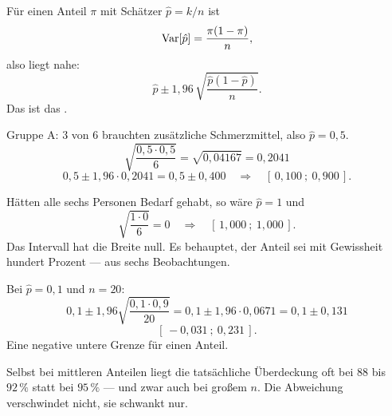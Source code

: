 \begin{merksatz}
Für einen Anteil $\pi$ mit Schätzer $\hat p = k/n$ ist
\[ \operatorname{Var}[\hat p] = \frac{\pi(1-\pi)}{n} , \]
also liegt nahe:
\[ \hat p \pm 1{,}96\,\sqrt{\frac{\hat p(1-\hat p)}{n}} . \]
Das ist das .

Gruppe A: $3$ von $6$ brauchten zusätzliche Schmerzmittel, also $\hat p = 0{,}5$.
\[ \sqrt{\frac{0{,}5 \cdot 0{,}5}{6}} = \sqrt{0{,}04167} = 0{,}2041 \]
\[ 0{,}5 \pm 1{,}96 \cdot 0{,}2041 = 0{,}5 \pm 0{,}400 \quad\Longrightarrow\quad [\,0{,}100\ ;\ 0{,}900\,] . \]
\end{merksatz}

\begin{warnung}
Hätten alle sechs Personen Bedarf gehabt, so wäre $\hat p = 1$ und
\[ \sqrt{\frac{1 \cdot 0}{6}} = 0 \quad\Longrightarrow\quad [\,1{,}000\ ;\ 1{,}000\,] . \]
Das Intervall hat die Breite null. Es behauptet, der Anteil sei mit Gewissheit hundert Prozent --- aus sechs Beobachtungen.

Bei $\hat p = 0{,}1$ und $n = 20$:
\[ 0{,}1 \pm 1{,}96\sqrt{\frac{0{,}1 \cdot 0{,}9}{20}} = 0{,}1 \pm 1{,}96 \cdot 0{,}0671 = 0{,}1 \pm 0{,}131 \]
\[ [\,-0{,}031\ ;\ 0{,}231\,] . \]
Eine negative untere Grenze für einen Anteil.

Selbst bei mittleren Anteilen liegt die tatsächliche Überdeckung oft bei $88$ bis $92\,\%$ statt bei $95\,\%$ --- und zwar auch bei großem $n$. Die Abweichung verschwindet nicht, sie schwankt nur.

\begin{center}
\begin{minipage}{0.88\textwidth}
\end{minipage}
\end{center}
\end{warnung}

